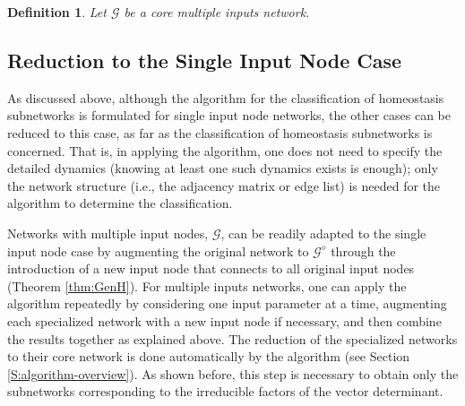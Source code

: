 \documentclass[pdflatex,sn-basic,Numbered]{sn-jnl}
\newcommand{\GG}{{\mathcal G}}
\theoremstyle{thmstyleone}%
\newtheorem{definition}[theorem]{Definition}
\newcommand{\END}{\hfill\mbox{\raggedright$\Diamond$}}
\numberwithin{equation}{section}
\begin{document}
\begin{definition} \normalfont
Let $\mathcal{G}$ be a core multiple inputs network.
\end{definition}

\subsection{Reduction to the Single Input Node Case}

As discussed above, although the algorithm for the  classification of homeostasis subnetworks is formulated for single input node networks, the other cases can be reduced to this case, as far as the classification of homeostasis subnetworks is concerned.
That is, in applying the algorithm, one does not need to specify the detailed dynamics (knowing at least one such dynamics exists is enough); only the network structure (i.e., the adjacency matrix or edge list) is needed for the algorithm to determine the classification. 

Networks with multiple input nodes, $\GG$, can be readily adapted to the single input node case by augmenting the original network to $\GG^\diamond$ through the introduction of a new input node that connects to all original input nodes (Theorem \ref{thm:GenH}).
For multiple inputs networks, one can apply the algorithm repeatedly by considering one input parameter at a time, augmenting each specialized network with a new input node if necessary, and then combine the results together as explained above.
The reduction of the specialized networks to their core network is done automatically by the algorithm (see Section \ref{S:algorithm-overview}).
As shown before, this step is necessary to obtain only the subnetworks corresponding to the irreducible factors of the vector determinant.
\end{document}
